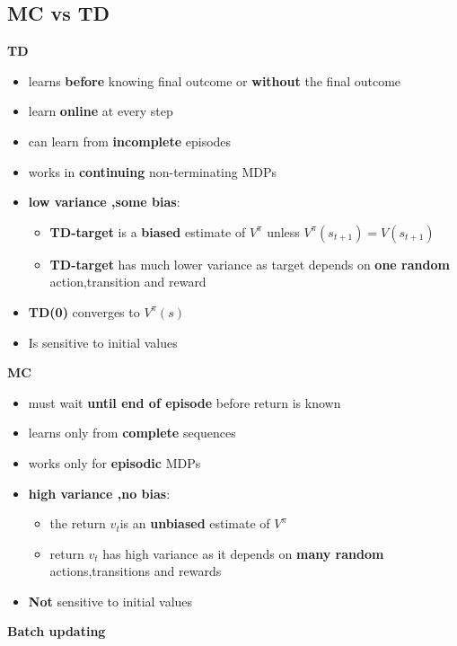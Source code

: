 \documentclass[12pt]{article} %
\begin{document}
\subsection{MC vs TD}
\textbf{TD}
\begin{itemize}
\item learns \textbf{before} knowing final outcome or \textbf{without} the final outcome
\item learn \textbf{online} at every step
\item can learn from \textbf{incomplete} episodes
\item works in \textbf{continuing} non-terminating MDPs
\item \textbf{low variance ,some bias}:
\begin{itemize}
\item \textbf{TD-target} is a \textbf{biased} estimate of $V^{\pi}$ unless $V^{\pi}(s_{t+1}) = V(s_{t+1})$
\item \textbf{TD-target} has much lower variance as target depends on \textbf{one random} action,transition and reward
\end{itemize}
\item \textbf{TD(0)} converges to $V^{\pi}(s)$
\item Is sensitive to initial values
\end{itemize}
\textbf{MC}
\begin{itemize}
\item must wait \textbf{until end of episode} before return is known
\item learns only from \textbf{complete} sequences
\item works only for \textbf{episodic} MDPs
\item \textbf{high variance ,no bias}:
\begin{itemize}
\item the return $v_t $is an \textbf{unbiased} estimate of $V^{\pi}$ 
\item return $v_t$ has high variance as it depends on \textbf{many random} actions,transitions and rewards
\end{itemize}
\item \textbf{Not} sensitive to initial values
\end{itemize}
\textbf{Batch updating}
\end{document}
